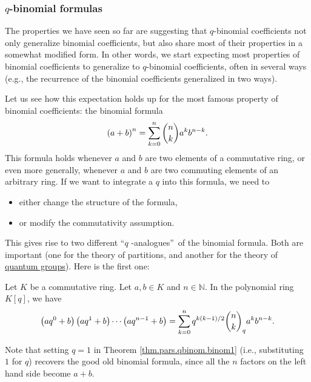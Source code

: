\subsubsection{$q$-binomial formulas}

The properties we have seen so far are suggesting that $q$-binomial
coefficients not only generalize binomial coefficients, but also share most of
their properties in a somewhat modified form. In other words, we start
expecting most properties of binomial coefficients to generalize to
$q$-binomial coefficients, often in several ways (e.g., the recurrence of the
binomial coefficients generalized in two ways).

Let us see how this expectation holds up for the most famous property of
binomial coefficients: the binomial formula%
\[
\left(  a+b\right)  ^{n}=\sum_{k=0}^{n}\dbinom{n}{k}a^{k}b^{n-k}.
\]
This formula holds whenever $a$ and $b$ are two elements of a commutative
ring, or even more generally, whenever $a$ and $b$ are two commuting elements
of an arbitrary ring. If we want to integrate a $q$ into this formula, we need to

\begin{itemize}
\item either change the structure of the formula,

\item or modify the commutativity assumption.
\end{itemize}

This gives rise to two different \textquotedblleft$q$%
-analogues\textquotedblright\ of the binomial formula. Both are important (one
for the theory of partitions, and another for the theory of
\href{https://www.ams.org/notices/200601/what-is.pdf}{quantum groups}). Here
is the first one:

\begin{theorem}
\label{thm.pars.qbinom.binom1}Let $K$ be a
commutative ring. Let $a,b\in K$ and $n\in\mathbb{N}$. In the polynomial ring
$K\left[  q\right]  $, we have%
\[
\left(  aq^{0}+b\right)  \left(  aq^{1}+b\right)  \cdots\left(  aq^{n-1}%
+b\right)  =\sum_{k=0}^{n}q^{k\left(  k-1\right)  /2}\dbinom{n}{k}_{q}%
a^{k}b^{n-k}.
\]

\end{theorem}

Note that setting $q=1$ in Theorem \ref{thm.pars.qbinom.binom1} (i.e.,
substituting $1$ for $q$) recovers the good old binomial formula, since all
the $n$ factors on the left hand side become $a+b$.

